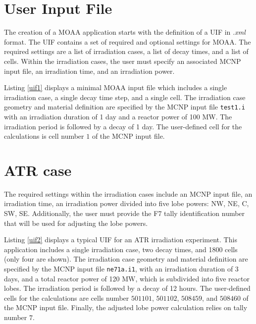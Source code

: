 \label{ref:moaa-exec}

\section{User Input File}
\label{sec:uif}

The creation of a MOAA application starts with the definition of a \gls*{UIF} in \textit{.xml} format.
The UIF contains a set of required and optional settings for MOAA.
The required settings are a list of irradiation cases, a list of decay times, and a list of cells.
Within the irradiation cases, the user must specify an associated MCNP input file, an irradiation time, and an irradiation power.

Listing \ref{uif1} displays a minimal MOAA input file which includes a single irradiation case, a single decay time step, and a single cell.
The irradiation case geometry and material definition are specified by the MCNP input file \texttt{test1.i} with an irradiation duration of 1 day and a reactor power of 100 MW.
The irradiation period is followed by a decay of 1 day.
The user-defined cell for the calculations is cell number $1$ of the MCNP input file.



\section{ATR case}
\label{sec:atr}

The required settings within the irradiation cases include an MCNP input file, an irradiation time, an irradiation power divided into five lobe powers: NW, NE, C, SW, SE.
Additionally, the user must provide the F7 tally identification number that will be used for adjusting the lobe powers.

Listing \ref{uif2} displays a typical UIF for an ATR irradiation experiment.
This application includes a single irradiation case, two decay times, and 1800 cells (only four are shown).
The irradiation case geometry and material definition are specified by the MCNP input file \texttt{ne71a.i1}, with an irradiation duration of 3 days, and a total reactor power of 120 MW, which is subdivided into five reactor lobes.
The irradiation period is followed by a decay of 12 hours.
The user-defined cells for the calculations are cells number $501101$, $501102$, $508459$, and $508460$ of the MCNP input file.
Finally, the adjusted lobe power calculation relies on tally number $7$.



